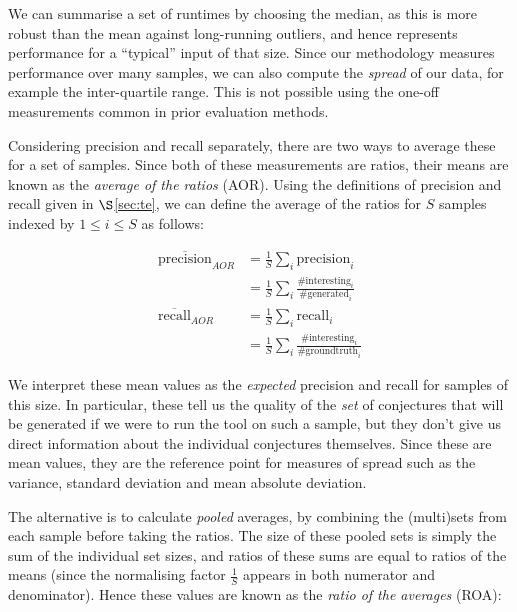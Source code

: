 We can summarise a set of runtimes by choosing the median, as this is more
robust than the mean against long-running outliers, and hence represents
performance for a ``typical'' input of that size. Since our methodology measures
performance over many samples, we can also compute the \emph{spread} of our
data, for example the inter-quartile range. This is not possible using the
one-off measurements common in prior evaluation methods.

Considering precision and recall separately, there are two ways to average these
for a set of samples. Since both of these measurements are ratios, their means
are known as the \emph{average of the ratios} (AOR). Using the definitions of
precision and recall given in $\S$\ref{sec:te}, we can define the average of the
ratios for $S$ samples indexed by $1 \leq i \leq S$ as follows:

\begin{align*}
       \overline{\text{precision}}_{AOR}
    &= \frac{1}{S} \sum_i{\text{precision}_i} \\
    &= \frac{1}{S} \sum_i{
         \frac{\#\text{interesting}_i}
              {\#\text{generated}_i}}         \\[10pt]
       \overline{\text{recall}}_{AOR}
    &= \frac{1}{S} \sum_i{\text{recall}_i} \\
    &= \frac{1}{S} \sum_i{
         \frac{\#\text{interesting}_i}
              {\#\text{groundtruth}_i}}
\end{align*}

We interpret these mean values as the \emph{expected} precision and recall for
samples of this size. In particular, these tell us the quality of the \emph{set}
of conjectures that will be generated if we were to run the tool on such a
sample, but they don't give us direct information about the individual
conjectures themselves. Since these are mean values, they are the reference
point for measures of spread such as the variance, standard deviation and mean
absolute deviation.

The alternative is to calculate \emph{pooled} averages, by combining the
(multi)sets from each sample before taking the ratios. The size of these pooled
sets is simply the sum of the individual set sizes, and ratios of these sums are
equal to ratios of the means (since the normalising factor $\frac{1}{S}$ appears
in both numerator and denominator). Hence these values are known as the
\emph{ratio of the averages} (ROA):

